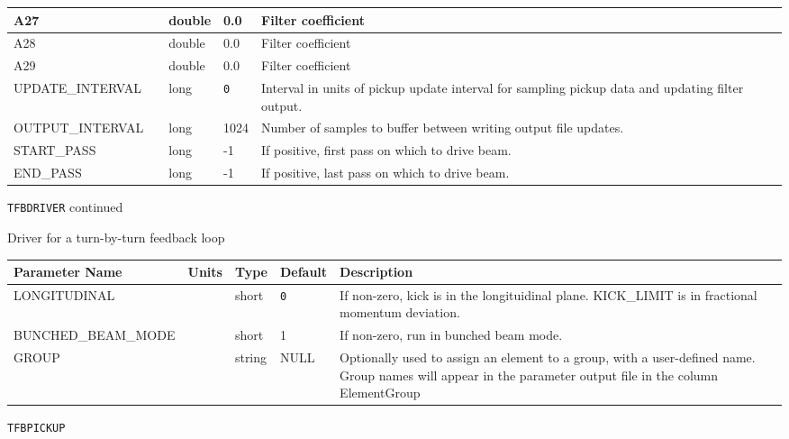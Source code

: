 \begin{tabular}{|l|l|l|l|p{\descwidth}|}
A27 &  & double &  0.0 & Filter coefficient  \\ \hline 
A28 &  & double &  0.0 & Filter coefficient  \\ \hline 
A29 &  & double &  0.0 & Filter coefficient  \\ \hline 
UPDATE\_INTERVAL &  & long &  \verb|0| & Interval in units of pickup update interval for sampling pickup data and updating filter output.  \\ \hline 
OUTPUT\_INTERVAL &  & long &   1024            & Number of samples to buffer between writing output file updates.  \\ \hline 
START\_PASS &  & long &   -1              & If positive, first pass on which to drive beam.  \\ \hline 
END\_PASS &  & long &   -1              & If positive, last pass on which to drive beam.  \\ \hline 
\end{tabular}

\newpage
\begin{center}{\Large\verb|TFBDRIVER| continued}\end{center}
Driver for a turn-by-turn feedback loop
\\
\begin{tabular}{|l|l|l|l|p{\descwidth}|} \hline
Parameter Name & Units & Type & Default & Description \\ \hline 
LONGITUDINAL &  & short &  \verb|0| & If non-zero, kick is in the longituidinal plane. KICK\_LIMIT is in fractional momentum deviation.  \\ \hline 
BUNCHED\_BEAM\_MODE &  & short &   1               & If non-zero, run in bunched beam mode.  \\ \hline 
GROUP &  & string & NULL & Optionally used to assign an element to a group, with a user-defined name.  Group names will appear in the parameter output file in the column ElementGroup  \\ \hline 
\end{tabular}

\vspace*{0.5in}

\newpage
\begin{center}{\Large\verb|TFBPICKUP|}\end{center}
